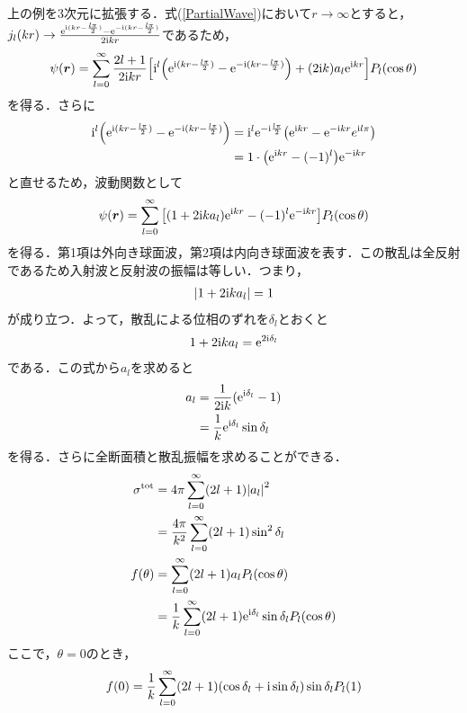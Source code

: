 \documentclass{report}
\begin{document}
  上の例を3次元に拡張する．式(\ref{PartialWave})において$r\to\infty$とすると，$j_l(kr)\to \frac{\mathrm{e}^{\mathrm{i}(kr - \frac{l\pi}{2})} - \mathrm{e}^{-\mathrm{i}(kr - \frac{l\pi}{2})}}{2\mathrm{i} kr}$であるため，
  \begin{align}
    \psi(\bm{r}) = \sum_{l=0}^{\infty} \frac{2l+1}{2\mathrm{i} kr}\qty[\mathrm{i}^l \qty(\mathrm{e}^{\mathrm{i}(kr - \frac{l\pi}{2})} - \mathrm{e}^{-\mathrm{i}(kr - \frac{l\pi}{2})}) + (2\mathrm{i} k) a_l \mathrm{e}^{\mathrm{i} kr}]P_l(\cos\theta)
  \end{align}
  を得る．さらに
  \begin{align}
    \mathrm{i}^l \qty(\mathrm{e}^{\mathrm{i}(kr - \frac{l\pi}{2})} - \mathrm{e}^{-\mathrm{i}(kr - \frac{l\pi}{2})}) &= \mathrm{i}^l \mathrm{e}^{-\mathrm{i}\frac{l\pi}{2}}\qty(\mathrm{e}^{\mathrm{i} kr} - \mathrm{e}^{-\mathrm{i} kr} e^{\mathrm{i} l\pi}) \\
    &= 1\cdot\qty(\mathrm{e}^{\mathrm{i} kr} - (-1)^l) \mathrm{e}^{-\mathrm{i} kr}
  \end{align}
  と直せるため，波動関数として
  \begin{align}
    \label{SCPartialWave}
    \psi(\bm{r}) = \sum_{l=0}^{\infty} \qty[(1 + 2\mathrm{i} ka_l)\mathrm{e}^{\mathrm{i} kr} - (-1)^l \mathrm{e}^{-\mathrm{i} kr}]P_l(\cos\theta)
  \end{align}
  を得る．第1項は外向き球面波，第2項は内向き球面波を表す．この散乱は全反射であるため入射波と反射波の振幅は等しい．つまり，
  \begin{align}
    \abs{1 + 2\mathrm{i} ka_l} = 1
  \end{align}
  が成り立つ．よって，散乱による位相のずれを$\delta_l$とおくと
  \begin{align}
    1 + 2\mathrm{i} ka_l = \mathrm{e}^{2\mathrm{i} \delta_l}
  \end{align}
  である．この式から$a_l$を求めると
  \begin{align}
    a_l &= \frac{1}{2\mathrm{i} k}(\mathrm{e}^{\mathrm{i} \delta_l} - 1) \\
    &= \frac{1}{k}\mathrm{e}^{\mathrm{i} \delta_l} \sin \delta_l
  \end{align}
  を得る．さらに全断面積と散乱振幅を求めることができる．
  \begin{align}
    \sigma^{\mathrm{tot}} &= 4\pi \sum_{l=0}^{\infty} (2l+1)\abs{a_l}^2 \\
    &= \frac{4\pi}{k^2} \sum_{l=0}^{\infty} (2l+1)\sin^2\delta_l \\
    f(\theta) &= \sum_{l=0}^{\infty} (2l+1)a_lP_l(\cos\theta) \\
    &= \frac{1}{k} \sum_{l=0}^{\infty}(2l+1)\mathrm{e}^{\mathrm{i}\delta_l}\sin\delta_lP_l(\cos\theta)
  \end{align}
  ここで，$\theta = 0$のとき，
  \begin{align}
    f(0) = \frac{1}{k} \sum_{l=0}^{\infty} (2l+1) (\cos\delta_l + \mathrm{i} \sin\delta_l)\sin\delta_l P_l(1)
  \end{align}
\end{document}

